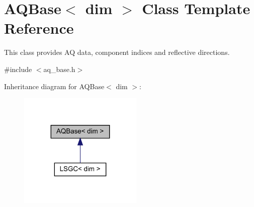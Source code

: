 \hypertarget{class_a_q_base}{}\section{A\+Q\+Base$<$ dim $>$ Class Template Reference}
\label{class_a_q_base}


This class provides AQ data, component indices and reflective directions.  




{\ttfamily \#include $<$aq\+\_\+base.\+h$>$}



Inheritance diagram for A\+Q\+Base$<$ dim $>$\+:\nopagebreak
\begin{figure}[H]
\begin{center}
\leavevmode
\includegraphics[width=167pt]{class_a_q_base__inherit__graph}
\end{center}
\end{figure}
